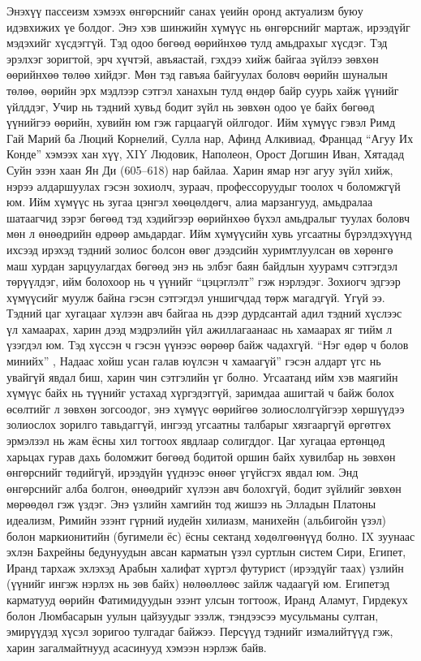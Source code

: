 Энэхүү пассеизм хэмээх өнгөрснийг санах үеийн оронд актуализм буюу идэвхижих үе болдог. Энэ хэв шинжийн хүмүүс нь өнгөрснийг мартаж, ирээдүйг мэдэхийг хүсдэггүй. Тэд одоо бөгөөд өөрийнхөө тулд амьдрахыг хүсдэг. Тэд эрэлхэг зоригтой, эрч хүчтэй, авъяастай, гэхдээ хийж байгаа зүйлээ зөвхөн өөрийнхөө төлөө хийдэг. Мөн тэд гавъяа байгуулах боловч өөрийн шуналын төлөө, өөрийн эрх мэдлээр сэтгэл ханахын тулд өндөр байр суурь хайж үүнийг үйлддэг, Учир нь тэдний хувьд бодит зүйл нь зөвхөн одоо үе байх бөгөөд үүнийгээ өөрийн, хувийн юм гэж гарцаагүй ойлгодог. Ийм хүмүүс гэвэл Римд Гай Марий ба Люций Корнелий, Сулла нар, Афинд Алкивиад, Францад “Агуу Их Конде” хэмээх хан хүү, XIY Людовик, Наполеон, Орост Догшин Иван, Хятадад Суйн эзэн хаан Ян Ди (605–618) нар байлаа. Харин ямар нэг агуу зүйл хийж, нэрээ алдаршуулах гэсэн зохиолч, зураач, профессоруудыг тоолох ч боломжгүй юм. Ийм хүмүүс нь зугаа цэнгэл хөөцөлдөгч, алиа марзангууд, амьдралаа шатаагчид зэрэг бөгөөд тэд хэдийгээр өөрийнхөө бүхэл амьдралыг туулах боловч мөн л өнөөдрийн өдрөөр амьдардаг. Ийм хүмүүсийн хувь угсаатны бүрэлдэхүүнд ихсээд ирэхэд тэдний золиос болсон өвөг дээдсийн хуримтлуулсан өв хөрөнгө маш хурдан зарцуулагдах бөгөөд энэ нь элбэг баян байдлын хуурамч сэтгэгдэл төрүүлдэг, ийм болохоор нь ч үүнийг “цэцэглэлт” гэж нэрлэдэг.
Зохиогч эдгээр хүмүүсийг муулж байна гэсэн сэтгэгдэл уншигчдад төрж магадгүй. Үгүй ээ. Тэдний цаг хугацааг хүлээн авч байгаа нь дээр дурдсантай адил тэдний хүслээс үл хамаарах, харин дээд мэдрэлийн үйл ажиллагаанаас нь хамаарах яг тийм л үзэгдэл юм. Тэд хүссэн ч гэсэн үүнээс өөрөөр байж чадахгүй. “Нэг өдөр ч болов минийх” , Надаас хойш усан галав юүлсэн ч хамаагүй” гэсэн алдарт үгс нь увайгүй явдал биш, харин чин сэтгэлийн үг болно. Угсаатанд ийм хэв маягийн хүмүүс байх нь түүнийг устахад хүргэдэггүй, заримдаа ашигтай ч байж болох өсөлтийг л зөвхөн зогсоодог, энэ хүмүүс өөрийгөө золиослолгүйгээр хөршүүдээ золиослох зорилго тавьдаггүй, ингээд угсаатны талбарыг хязгааргүй өргөтгөх эрмэлзэл нь жам ёсны хил тогтоох явдлаар солигддог.
Цаг хугацаа ертөнцөд харьцах гурав дахь боломжит бөгөөд бодитой оршин байх хувилбар нь зөвхөн өнгөрснийг төдийгүй, ирээдүйн үүднээс өнөөг үгүйсгэх явдал юм. Энд өнгөрснийг алба болгон, өнөөдрийг хүлээн авч болохгүй, бодит зүйлийг зөвхөн мөрөөдөл гэж үздэг. Энэ үзлийн хамгийн тод жишээ нь Элладын Платоны идеализм, Римийн эзэнт гүрний иудейн хилиазм, манихейн (альбигойн үзэл) болон маркионитийн (бугимели ёс) ёсны сектанд хөдөлгөөнүүд болно. IX зуунаас эхлэн Бахрейны бедунуудын авсан карматын үзэл суртлын систем Сири, Египет, Иранд тархаж эхлэхэд Арабын халифат хүртэл футурист (ирээдүйг таах) үзлийн (үүнийг ингэж нэрлэх нь зөв байх) нөлөөллөөс зайлж чадаагүй юм. Египетэд карматууд өөрийн Фатимидуудын эзэнт улсын тогтоож, Иранд Аламут, Гирдекух болон Люмбасарын уулын цайзуудыг эзэлж, тэндээсээ мусульманы султан, эмирүүдэд хүсэл зоригоо тулгадаг байжээ. Персүүд тэднийг измалийтүүд гэж, харин загалмайтнууд асасинууд хэмээн нэрлэж байв.

